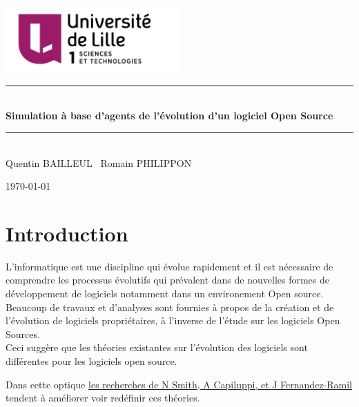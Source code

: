 \documentclass{article}
\newcommand{\HRule}{\rule{\linewidth}{0.5mm}}
\begin{document}
\begin{titlepage}
  \begin{center}

    \includegraphics[width=0.5\textwidth]{pictures/ul.png}~\\[1cm]

    \HRule \\[0.2cm]
    { \huge \bfseries Simulation à base d'agents de l'évolution d'un
      logiciel Open Source \\[0.4cm] }

    \HRule \\[1.5cm]
    Quentin BAILLEUL \  Romain PHILIPPON

    \vfill

    {\large \today}

  \end{center}
\end{titlepage}

\newpage
\tableofcontents

\newpage

\section{Introduction}
L'informatique est une discipline qui évolue rapidement et
il est nécessaire de comprendre
les processus évolutifs qui prévalent dans de nouvelles formes de
développement de logiciels notamment dans un environement Open source.
\\

Beaucoup de travaux et d'analyses sont fournies à propos de la
création et de l'évolution de logiciels propriétaires, à l'inverse de
l'étude sur les logiciels Open Sources.
\\

Ceci suggère que les théories existantes sur l'évolution des logiciels
sont différentes pour les logiciels open source.

Dans cette optique \href{http://oro.open.ac.uk/4698/1/}{les recherches de N Smith, A Capiluppi, et
  J Fernandez-Ramil} tendent à améliorer voir redéfinir ces théories.
\\
\end{document}
